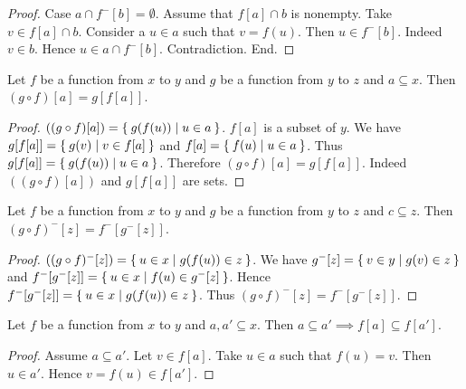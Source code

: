 \documentclass[../../set-theory.tex]{subfiles}
\begin{document}
\begin{forthel}
\begin{proof}
      Case $a \cap f^{-}[b] = \emptyset$.
        Assume that $f[a] \cap b$ is nonempty.
        Take $v \in f[a] \cap b$.
        Consider a $u \in a$ such that $v = f(u)$.
        Then $u \in f^{-}[b]$.
        Indeed $v \in b$.
        Hence $u \in a \cap f^{-}[b]$.
        Contradiction.
      End.
    \end{proof}

    \begin{proposition}\label{SetTheory_02_02_522811}
      Let $f$ be a function from $x$ to $y$ and $g$ be a function from $y$ to $z$ and $a \subseteq x$.
      Then $(g \circ f)[a] = g[f[a]]$.
    \end{proposition}
    \begin{proof}
      $((g \circ f)[a]) = \Set{g(f(u)) | u \in a}$.
      $f[a]$ is a subset of $y$.
      We have $g[f[a]] = \Set{g(v) | v \in f[a]}$ and $f[a] = \Set{f(u) | u \in a}$.
      Thus $g[f[a]] = \Set{g(f(u)) | u \in a}$.
      Therefore $(g \circ f)[a] = g[f[a]]$.
      Indeed $((g \circ f)[a])$ and $g[f[a]]$ are sets.
    \end{proof}

    \begin{proposition}\label{SetTheory_02_02_819065}
      Let $f$ be a function from $x$ to $y$ and $g$ be a function from $y$ to $z$ and $c \subseteq z$.
      Then $(g \circ f)^{-}[z] = f^{-}[g^{-}[z]]$.
    \end{proposition}
    \begin{proof}
      $((g \circ f)^{-}[z]) = \Set{u \in x | g(f(u)) \in z}$.
      We have $g^{-}[z] = \Set{v \in y | g(v) \in z}$ and $f^{-}[g^{-}[z]] = \Set{u \in x | f(u) \in g^{-}[z]}$.
      Hence $f^{-}[g^{-}[z]] = \Set{u \in x | g(f(u)) \in z}$.
      Thus $(g \circ f)^{-}[z] = f^{-}[g^{-}[z]]$.
    \end{proof}

    \begin{proposition}\label{SetTheory_02_02_889945}
      Let $f$ be a function from $x$ to $y$ and $a,a' \subseteq x$.
      Then $a \subseteq a' \implies f[a] \subseteq f[a']$.
    \end{proposition}
    \begin{proof}
      Assume $a \subseteq a'$.
      Let $v \in f[a]$.
      Take $u \in a$ such that $f(u) = v$.
      Then $u \in a'$.
      Hence $v = f(u) \in f[a']$.
    \end{proof}


\end{forthel}
\end{document}
